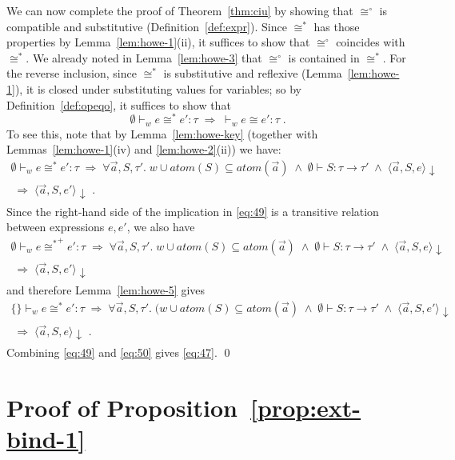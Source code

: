 \documentclass{LMCS}
\theoremstyle{plain}
\theoremstyle{definition}
\newcommand{\atoms}{\mathit{atom}}
\newcommand{\config}[3]{\langle#1, #2, #3\rangle}
\renewcommand{\conj}{\wedge}
\newcommand{\ent}{\vdash}
\newcommand{\enty}{\vdash}
\renewcommand{\exp}[1][e]{#1}
\newcommand{\FUNTY}{\mathbin{\rightarrow}}
\newcommand{\imp}{\Rightarrow}
\newcommand{\ofty}{:}
\newcommand{\opeq}{\cong}
\newcommand{\opeqo}{\cong^{\circ}}
\newcommand{\s}[1][a]{\vec{#1}}
\newcommand{\stk}[1][S]{#1}
\newcommand{\terminates}[1][]{{\downarrow_{#1}}}
\newcommand{\ty}{\tau}
\newcommand{\w}[1][w]{#1}
\begin{document}
We can now complete the proof of Theorem~\ref{thm:ciu} by showing that
$\opeqo$ is compatible and substitutive (Definition~\ref{def:expr}).
Since $\opeq^*$ has those properties by Lemma~\ref{lem:howe-1}(ii), it
suffices to show that $\opeqo$ coincides with $\opeq^*$. We already
noted in Lemma~\ref{lem:howe-3} that $\opeqo$ is contained in
$\opeq^*$. For the reverse inclusion, since $\opeq^*$ is substitutive
and reflexive (Lemma~\ref{lem:howe-1}), it is closed under
substituting values for variables; so by Definition~\ref{def:opeqo}, it
suffices to show that
\begin{equation}
  \label{eq:47}
  \emptyset\ent_{\w} \exp\opeq^*\exp' \ofty\ty \;\imp\; 
  {}\ent_{\w} \exp\opeq \exp'\ofty\ty\;.
\end{equation}
To see this, note that by Lemma~\ref{lem:howe-key} (together with
Lemmas~\ref{lem:howe-1}(iv) and \ref{lem:howe-2}(ii)) we have:
\begin{multline}
  \label{eq:49}
  \emptyset\ent_{\w} \exp\opeq^* \exp' \ofty\ty \;\imp\; \forall
  \s,\stk,\ty'.\; \w\cup\atoms(\stk)\subseteq\atoms(\s) \;\conj\;
  \emptyset\enty\stk\ofty\ty\FUNTY\ty' \;\conj\;
  \config{\s}{\stk}{\exp}\terminates \\
  \;\imp\; \config{\s}{\stk}{\exp'}\terminates\;.
\end{multline}
Since the right-hand side of the implication in \eqref{eq:49} is a
transitive relation between expressions $\exp,\exp'$, we also have
\begin{multline*}
  \emptyset\ent_{\w} \exp\mathrel{{\opeq^*}^+} \exp' \ofty\ty \;\imp\;
  \forall \s,\stk,\ty'.\; \w\cup\atoms(\stk)\subseteq\atoms(\s) \;\conj\;
  \emptyset\enty\stk\ofty\ty\FUNTY\ty' \;\conj\;
  \config{\s}{\stk}{\exp}\terminates\\
  \;\imp\; \config{\s}{\stk}{\exp'}\terminates
\end{multline*}
and therefore Lemma~\ref{lem:howe-5} gives
\begin{multline}
  \label{eq:50}
  \{\}\ent_{\w} \exp\opeq^* \exp' \ofty\ty \;\imp\; \forall
  \s,\stk,\ty'.\; (\w\cup\atoms(\stk)\subseteq\atoms(\s) \;\conj\;
  \emptyset\enty\stk\ofty\ty\FUNTY\ty' \;\conj\;
  \config{\s}{\stk}{\exp'}\terminates\\
  \;\imp\; \config{\s}{\stk}{\exp}\terminates\;.
\end{multline}
Combining \eqref{eq:49} and \eqref{eq:50} gives \eqref{eq:47}.  \qed


\section{Proof of Proposition~\ref{prop:ext-bind-1}}
\label{app:proof-ext-bind-1-proposition}
\end{document}
